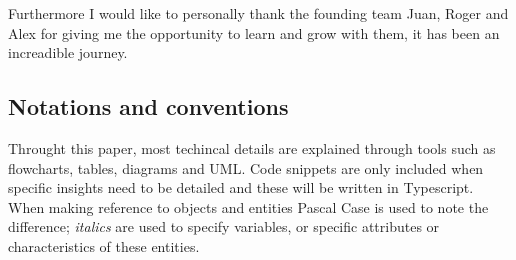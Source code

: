 Furthermore I would like to personally thank the founding team Juan, Roger and Alex for giving me the opportunity to learn and grow with them, it has been an increadible journey.

\subsection*{Notations and conventions}

Throught this paper, most techincal details are explained through tools such as flowcharts, tables, diagrams and UML. Code snippets are only included when specific insights need to be detailed and these will be written in Typescript. When making reference to objects and entities Pascal Case is used to note the difference; \textit{italics} are used to specify variables, or specific attributes or characteristics of these entities.

